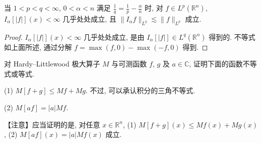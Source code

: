 \begin{corollary}\label{cor:3.1}
当 $1 < p < q < \infty$, $0 < \alpha < n$ 满足 $\frac{1}{q} = \frac{1}{p} - \frac{\alpha}{n}$ 时, 对 $f \in L^{p}(\mathbb{R}^{n})$, $I_{\alpha}[|f|](x) < \infty$ 几乎处处成立, 且 $\|I_{\alpha}f\|_{L^{q}} \lesssim \|f\|_{L^{p}}$ 成立.
\end{corollary}

\begin{proof}
$I_{\alpha}[|f|](x) < \infty$ 几乎处处成立, 是由 $I_{\alpha}[|f|] \in L^{q}(\mathbb{R}^{n})$ 得到的. 不等式如上面所述, 通过分解 $f = \max(f, 0) - \max(-f, 0)$ 得到.
\end{proof}

\begin{exercise}\label{exer:3.6}
对 Hardy--Littlewood 极大算子 $M$ 与可测函数 $f$, $g$ 及 $a \in \mathbb{C}$, 证明下面的函数不等式或等式.

(1) $M[f+g] \leq Mf + Mg$. 不过, 可以承认积分的三角不等式.

(2) $M[af] = |a|Mf$.

【注意】应当证明的是, 对任意 $x \in \mathbb{R}^{n}$, (1) $M[f+g](x) \leq Mf(x) + Mg(x)$, (2) $M[af](x) = |a|Mf(x)$ 成立.
\end{exercise}
